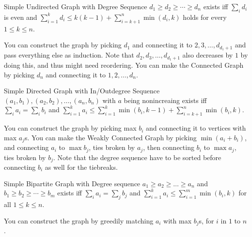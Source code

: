 Simple Undirected Graph with Degree Sequence $d_1 \ge d_2 \ge \cdots \ge d_n$ exists iff $\sum_i d_i$ is even and $\sum_{i=1}^{k} d_i \le k(k-1) + \sum_{i=k+1}^{n} \min(d_i, k)$ holds for every $1 \le k \le n$.

You can construct the graph by picking $d_1$ and connecting it to $2, 3, \ldots, d_{d_1+1}$ and pass everything else as induction. Note that $d_2, d_3, \ldots, d_{d_1+1}$ also decreases by $1$ by doing this, and thus might need reordering.
You can make the Connected Graph by picking $d_n$ and connecting it to $1, 2, \dots, d_n$.

Simple Directed Graph with In/Outdegree Sequence $(a_1, b_1), (a_2, b_2), \ldots, (a_n, b_n)$ with $a$ being nonincreaing exists iff $\sum_i a_i = \sum_i b_i$ and $\sum_{i=1}^{k} a_i \le \sum_{i=1}^{k} \min(b_i, k-1) + \sum_{i=k+1}^{n} \min(b_i, k)$.

You can construct the graph by picking max $b_i$ and connecting it to vertices with max $a_j$s.
You can make the Weakly Connected Graph by picking $\min(a_i+b_i)$, and connecting $a_i$ to $\max b_j$, ties broken by $a_j$, then connecting $b_i$ to $\max a_j$, ties broken by $b_j$.
Note that the degree sequence have to be sorted before connecting $b_i$ as well for the tiebreaks.

Simple Bipartite Graph with Degree sequence $a_1 \ge a_2 \ge \ldots \ge a_n$ and $b_1 \ge b_2 \ge \cdots \ge b_m$ exists iff $\sum_i a_i = \sum_j b_j$ and $\sum_{i=1}^{k} a_i \le \sum_{i=1}^{m} \min(b_i, k)$ for all $1 \le k \le n$.

You can construct the graph by greedily matching $a_i$ with max $b_j$s, for $i$ in $1$ to $n$.